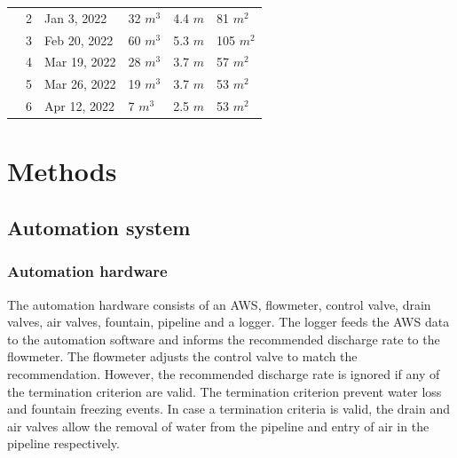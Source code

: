 \documentclass[tc, manuscript]{copernicus}
\begin{document}
\begin{table}
\begin{tabular}{@{}|llllll|@{}}
		\multicolumn{1}{|l|}{} & 2            & Jan 3, 2022   & 32 $m^{3}$      & 4.4 $m$
		                       & 81 $m^{2}$                                                                       \\
		\multicolumn{1}{|l|}{} & 3            & Feb 20, 2022   & 60 $m^{3}$      & 5.3 $m$
		                       & 105 $m^{2}$                                                                       \\
		\multicolumn{1}{|l|}{} & 4            & Mar 19, 2022   & 28 $m^{3}$      & 3.7 $m$
		                       & 57 $m^{2}$                                                                       \\
		\multicolumn{1}{|l|}{} & 5            & Mar 26, 2022   & 19 $m^{3}$      & 3.7 $m$
		                       & 53 $m^{2}$                                                                       \\
		\multicolumn{1}{|l|}{} & 6            & Apr 12, 2022   & 7 $m^{3}$      & 2.5 $m$
		                       & 53 $m^{2}$                                                                       \\
		\bottomrule
	\end{tabular}

\end{table}

\section{Methods}

\subsection{Automation system}


\subsubsection{Automation hardware}

The automation hardware consists of an AWS, flowmeter, control valve, drain valves, air valves, fountain,
pipeline and a logger. The logger feeds the AWS data to the automation software and informs the recommended
discharge rate to the flowmeter. The flowmeter adjusts the control valve to match the recommendation. However,
the recommended discharge rate is ignored if any of the termination criterion are valid. The termination
criterion prevent water loss and fountain freezing events. In case a termination criteria is valid, the drain
and air valves allow the removal of water from the pipeline and entry of air in the pipeline respectively.
\end{document}
